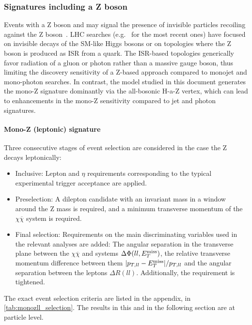 \subsubsection{Signatures including a Z boson}

Events with a Z boson and \MET may signal the presence of invisible particles recoiling against the Z boson~\cite{Carpenter:2012rg,Bell:2012rg}. 
LHC searches (e.g.~\cite{Aaboud:2017bja,Sirunyan:2017qfc} for the most recent ones) have focused on invisible decays of the SM-like Higgs bosons or on topologies where the Z boson is produced as ISR from a quark. 
The ISR-based topologies generically favor radiation of a gluon or photon rather than a massive gauge boson, thus limiting the discovery sensitivity of a Z-based approach compared to monojet and mono-photon searches. 
In contrast, the model studied in this document generates the mono-Z signature dominantly via the all-bosonic H-a-Z vertex, which can lead to enhancements in the mono-Z sensitivity compared to jet and photon signatures. 

\paragraph{Mono-Z (leptonic) signature}

Three consecutive stages of event selection are considered in the case the Z decays leptonically:

\begin{itemize}
\item Inclusive: Lepton \pt and $\eta$ requirements corresponding to the typical experimental trigger acceptance are applied.
\item Preselection: A dilepton candidate with an invariant mass in a window around the Z mass is required, and a minimum transverse momentum of the $\chi\overline{\chi}$ system is required.
\item Final selection: Requirements on the main discriminating variables used in the relevant analyses are added: The angular separation in the transverse plane between the $\chi\overline{\chi}$ and \lp\lm systems $\Delta\Phi(ll,E_T^\mathrm{miss})$, the relative transverse momentum difference between them $|p_{T,ll} - E_T^\mathrm{miss}|/p_{T,ll}$ and the angular separation between the leptons $\Delta R(ll)$. Additionally, the \MET requirement is tightened.
\end{itemize}

The exact event selection criteria are listed in the appendix, in \autoref{tab:monozll_selection}. The results in this and in the following section are at particle level. 

